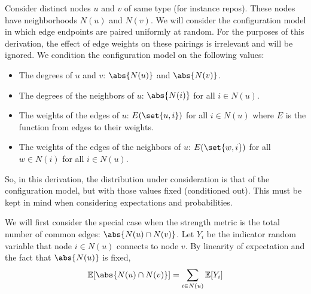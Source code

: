 \documentclass{pset}
\begin{document}
Consider distinct nodes $u$ and $v$ of same type (for instance repos).  These
nodes have neighborhoods $N(u)$ and $N(v)$.  We will consider the configuration
model in which edge endpoints are paired uniformly at random.  For the purposes
of this derivation, the effect of edge weights on these pairings is irrelevant
and will be ignored.  We condition the configuration model on the following
values:
\begin{itemize}
    \item The degrees of $u$ and $v$: $\abs{N(u)}$ and $\abs{N(v)}$.
    \item The degrees of the neighbors of $u$: $\abs{N(i)}$ for all $i \in
        N(u)$. 
    \item The weights of the edges of $u$: $E(\set{u, i})$ for all 
        $i \in N(u)$ where $E$ is the function from edges to their weights.
    \item The weights of the edges of the neighbors of $u$: $E(\set{w, i})$ for all 
        $w \in N(i)$ for all $i \in N(u)$.
\end{itemize}
So, in this derivation, the distribution
under consideration is that of the configuration model, but with
those values fixed (conditioned out). This must be kept in mind
when considering expectations and probabilities.


We will first consider the special case when the strength metric is
the total number of common edges: $\abs{N(u) \cap N(v)}$.
Let $Y_i$ be the indicator random variable that node $i \in N(u)$
connects to node $v$. 
By linearity of expectation and the fact that $\abs{N(u)}$ is fixed,
\[\Exp[\abs{N(u) \cap N(v)}] = \sum_{i\in N(u)} \Exp[Y_i]\]
\end{document}
